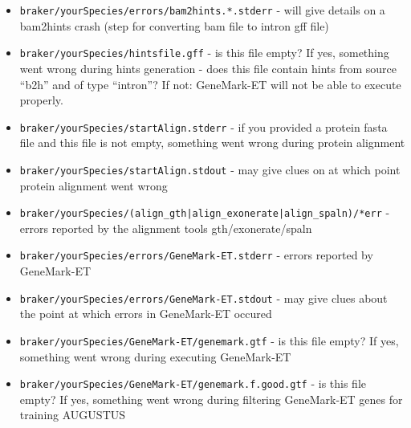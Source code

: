 \documentclass[a4paper,10pt]{report}
\begin{document}
\begin{itemize}
 \item  \texttt{braker/yourSpecies/errors/bam2hints.*.stderr} - will give details on a bam2hints crash (step for 
                                                  converting bam file to intron gff file)
 
 \item  \texttt{braker/yourSpecies/hintsfile.gff} - is this file empty? If yes, something went wrong during hints 
                                      generation
                                    - does this file contain hints from source ``b2h'' and of type 
                                      ``intron''? If not: GeneMark-ET will not be able to execute 
                                      properly.
 
 \item  \texttt{braker/yourSpecies/startAlign.stderr} - if you provided a protein fasta file and this file is not
                                          empty, something went wrong during protein alignment
\item    \texttt{braker/yourSpecies/startAlign.stdout} - may give clues on at which point protein alignment went
                                          wrong

 \item  \texttt{braker/yourSpecies/(align\_gth|align\_exonerate|align\_spaln)/*err} - errors reported by the 
																																		 alignment tools 
                                                                     gth/exonerate/spaln

 \item  \texttt{braker/yourSpecies/errors/GeneMark-ET.stderr} - errors reported by GeneMark-ET
 \item  \texttt{braker/yourSpecies/errors/GeneMark-ET.stdout} - may give clues about the point at which errors in
                                                  GeneMark-ET occured

 \item  \texttt{braker/yourSpecies/GeneMark-ET/genemark.gtf} - is this file empty? If yes, something went wrong 
                                                 during executing GeneMark-ET

 \item  \texttt{braker/yourSpecies/GeneMark-ET/genemark.f.good.gtf} - is this file empty? If yes, something went
                                                        wrong during filtering GeneMark-ET genes 
                                                        for training AUGUSTUS
 

\end{itemize}
\end{document}
